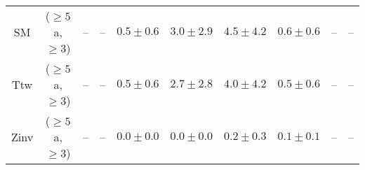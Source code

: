 \begin{table}[h!]
{\begin{tabular}{cccccccccc}
	SM & ($\ge5$a, $\ge3$) & -- & -- & $0.5\pm 0.6$ & $3.0\pm 2.9$ & $4.5\pm 4.2$ & $0.6\pm 0.6$ & -- & -- \\[0.5ex] 
	Ttw & ($\ge5$a, $\ge3$) & -- & -- & $0.5\pm 0.6$ & $2.7\pm 2.8$ & $4.0\pm 4.2$ & $0.5\pm 0.6$ & -- & -- \\[0.5ex] 
	Zinv & ($\ge5$a, $\ge3$) & -- & -- & $0.0\pm 0.0$ & $0.0\pm 0.0$ & $0.2\pm 0.3$ & $0.1\pm 0.1$ & -- & -- \\[0.5ex] 
	\hline
	\hline
\end{tabular}}
\end{table}
